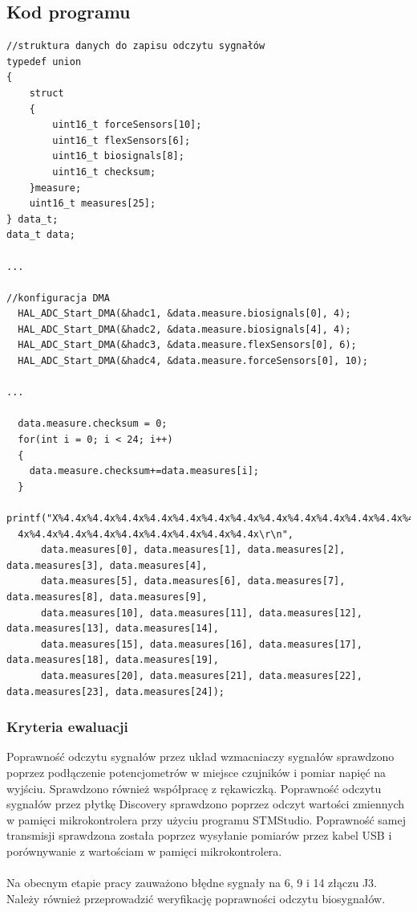 \documentclass{article}
\begin{document}
\subsection{Kod programu}
\begin{verbatim}
//struktura danych do zapisu odczytu sygnałów
typedef union
{
	struct
	{
		uint16_t forceSensors[10];
		uint16_t flexSensors[6];
		uint16_t biosignals[8];
		uint16_t checksum;
	}measure;
	uint16_t measures[25];
} data_t;
data_t data;

...

//konfiguracja DMA
  HAL_ADC_Start_DMA(&hadc1, &data.measure.biosignals[0], 4);
  HAL_ADC_Start_DMA(&hadc2, &data.measure.biosignals[4], 4);
  HAL_ADC_Start_DMA(&hadc3, &data.measure.flexSensors[0], 6);
  HAL_ADC_Start_DMA(&hadc4, &data.measure.forceSensors[0], 10);

...

  data.measure.checksum = 0;
  for(int i = 0; i < 24; i++)
  {
    data.measure.checksum+=data.measures[i];
  }
  printf("X%4.4x%4.4x%4.4x%4.4x%4.4x%4.4x%4.4x%4.4x%4.4x%4.4x%4.4x%4.4x%4.4x%4.4x%4.4x%4.4x%4.
  4x%4.4x%4.4x%4.4x%4.4x%4.4x%4.4x%4.4x%4.4x\r\n",
	  data.measures[0], data.measures[1], data.measures[2], data.measures[3], data.measures[4],
	  data.measures[5], data.measures[6], data.measures[7], data.measures[8], data.measures[9],
	  data.measures[10], data.measures[11], data.measures[12], data.measures[13], data.measures[14],
	  data.measures[15], data.measures[16], data.measures[17], data.measures[18], data.measures[19],
	  data.measures[20], data.measures[21], data.measures[22], data.measures[23], data.measures[24]);
\end{verbatim}

\subsubsection{Kryteria ewaluacji}
Poprawność odczytu sygnałów przez układ wzmacniaczy sygnałów sprawdzono poprzez podłączenie potencjometrów w miejsce czujników i pomiar napięć na wyjściu. Sprawdzono również współpracę z rękawiczką. 
Poprawność odczytu sygnałów przez płytkę Discovery sprawdzono poprzez odczyt wartości zmiennych w pamięci mikrokontrolera przy użyciu programu STMStudio.
Poprawność samej transmisji sprawdzona została poprzez wysyłanie pomiarów przez kabel USB i porównywanie z wartościam w pamięci mikrokontrolera.\\
\\
Na obecnym etapie pracy zauważono błędne sygnały na 6, 9 i 14 złączu J3.\\
Należy również przeprowadzić weryfikację poprawności odczytu biosygnałów.
\end{document}
